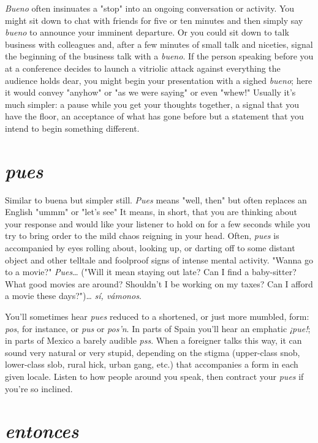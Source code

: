 \emph{Bueno} often insinuates a "stop" into an ongoing conversation
or activity. You might sit down to chat with friends for five or ten minutes and then simply say \emph{bueno} to announce your imminent departure. Or you could sit down to talk business with colleagues and, after
a few minutes of small talk and niceties, signal the beginning of the
business talk with a \emph{bueno}. If the person speaking before you at a conference decides to launch a vitriolic attack against everything the audience holds dear, you might begin your presentation with a sighed
\emph{bueno}; here it would convey "anyhow" or "as we were saying" or
even "whew!" Usually it's much simpler: a pause while you get your
thoughts together, a signal that you have the floor, an acceptance of
what has gone before but a statement that you intend to begin something different.

\section{\emph{pues}}

Similar to buena but simpler still. \emph{Pues} means "well, then"
but often replaces an English "ummm" or "let's see" It means, in
short, that you are thinking about your response and would like your
listener to hold on for a few seconds while you try to bring order to the
mild chaos reigning in your head. Often, \emph{pues} is accompanied by eyes
rolling about, looking up, or darting off to some distant object and
other telltale and foolproof signs of intense mental activity. "Wanna
go to a movie?" \emph{Pues}\ldots{} ("Will it mean staying out late? Can I find a
baby-sitter? What good movies are around? Shouldn't I be working on
my taxes? Can I afford a movie these days?")\ldots{} \emph{sí, vámonos}.

You'll sometimes hear \emph{pues} reduced to a shortened, or just
more mumbled, form: \emph{pos}, for instance, or \emph{pus} or \emph{pos'n}. In parts of
Spain you'll hear an emphatic \emph{¡pue!}; in parts of Mexico a barely audible \emph{pss}. When a foreigner talks this way, it can sound very natural
or very stupid, depending on the stigma (upper-class snob, lower-class
slob, rural hick, urban gang, etc.) that accompanies a form in each
given locale. Listen to how people around you speak, then contract
your \emph{pues} if you're so inclined.

\section{\emph{entonces}}

